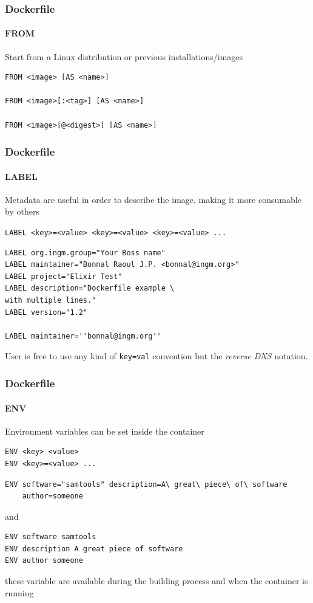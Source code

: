 \begin{frame}[fragile]
\frametitle{Dockerfile}
\framesubtitle{FROM}

Start from a Linux distribution or previous installations/images

\begin{lstlisting}
FROM <image> [AS <name>]

FROM <image>[:<tag>] [AS <name>]

FROM <image>[@<digest>] [AS <name>]
\end{lstlisting}
\end{frame}

\begin{frame}[fragile]
\frametitle{Dockerfile}
\framesubtitle{LABEL}

Metadata are useful in order to describe the image, making it more consumable by others

\lstinline!LABEL <key>=<value> <key>=<value> <key>=<value> ...!

\begin{lstlisting}
LABEL org.ingm.group="Your Boss name"
LABEL maintainer="Bonnal Raoul J.P. <bonnal@ingm.org>"
LABEL project="Elixir Test"
LABEL description="Dockerfile example \
with multiple lines."
LABEL version="1.2"
 
LABEL maintainer=''bonnal@ingm.org''
\end{lstlisting}

User is free to use any kind of \lstinline!key=val! convention but the \textit{reverse DNS} notation.
\end{frame}

\begin{frame}[fragile]
\frametitle{Dockerfile}
\framesubtitle{ENV}

Environment variables can be set inside the container

\begin{lstlisting}
ENV <key> <value>
ENV <key>=<value> ...
\end{lstlisting}

\begin{lstlisting}
ENV software="samtools" description=A\ great\ piece\ of\ software
    author=someone
\end{lstlisting}	
and
	
\begin{lstlisting}
ENV software samtools
ENV description A great piece of software
ENV author someone
\end{lstlisting}

these variable are available during the building process and when the container is running
\end{frame}

